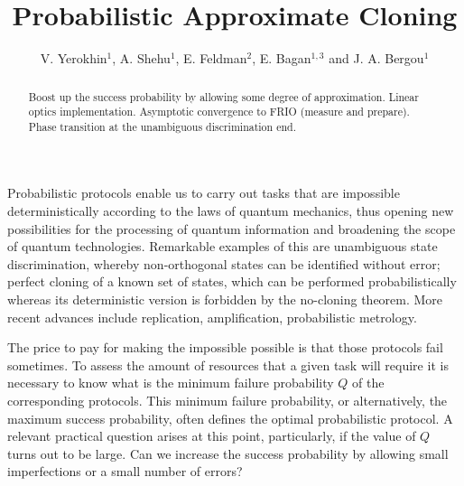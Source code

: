 \documentclass[aps,pra,twocolumn,showpacs]{revtex4-1}
\begin{document}
 \title{Probabilistic Approximate Cloning}
\author{V. Yerokhin$^{1}$, A. Shehu$^{1}$, E. Feldman$^{2}$, E. Bagan$^{1,3}$ and J. A. Bergou$^{1}$}

\begin{abstract} 
Boost up the success probability by allowing some degree of approximation. Linear optics implementation.  Asymptotic convergence to FRIO (measure and prepare). Phase transition at the unambiguous discrimination end.
\end{abstract}
\maketitle 

Probabilistic protocols enable us to carry out tasks that are impossible deterministically according to the laws of quantum mechanics, thus opening new possibilities for the processing of quantum information and broadening the scope of  quantum technologies. Remarkable examples of this are unambiguous state discrimination, whereby non-orthogonal states can be identified without error; perfect cloning of a known set of states, which can be performed probabilistically whereas its deterministic version is forbidden by the no-cloning theorem. More recent advances include replication, amplification, probabilistic metrology.

The price to pay for making the impossible possible is that those protocols fail sometimes. To assess the amount of resources that a given task will require it is necessary to know what is the minimum failure probability $Q$ of the corresponding protocols. This minimum failure probability, or alternatively, the maximum success probability, often defines the optimal probabilistic protocol. A relevant practical question arises at this point, particularly, if the value of $Q$ turns out to be large. Can we increase the success probability by allowing small imperfections or a small number of errors? 
\end{document}
